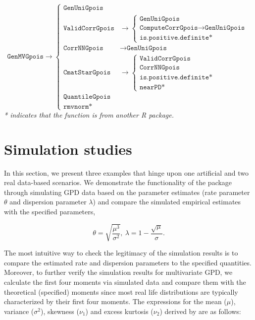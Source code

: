 $$
    \texttt{GenMVGpois} \longrightarrow
    \begin{cases}
        \texttt{GenUniGpois} \\
        \texttt{ValidCorrGpois} & \longrightarrow 
        \begin{cases}
            \texttt{GenUniGpois} \\
            \texttt{ComputeCorrGpois} \longrightarrow \texttt{GenUniGpois} \\
            \texttt{is.positive.definite*}
        \end{cases} \\
        \texttt{CorrNNGpois} & \longrightarrow \texttt{GenUniGpois} \\
        \texttt{CmatStarGpois} & \longrightarrow
        \begin{cases}
            \texttt{ValidCorrGpois} \\
            \texttt{CorrNNGpois} \\
            \texttt{is.positive.definite*} \\ \texttt{nearPD*}
        \end{cases} \\
        \texttt{QuantileGpois} \\
        \texttt{rmvnorm*}
    \end{cases}
$$
\textit{* indicates that the function is from another R package.}

\section{Simulation studies}

In this section, we present three examples that hinge upon one artificial and two real data-based scenarios. We demonstrate the functionality of the package through simulating GPD data based on the parameter estimates (rate parameter $\theta$ and dispersion parameter $\lambda$) and compare the simulated empirical estimates with the specified parameters,

\begin{equation}
\label{eq-1}
    \theta = \sqrt{\frac{\mu^3}{\sigma^2}}, \ \lambda = 1 - \frac{\sqrt{\mu}}{\sigma}.
\end{equation}

The most intuitive way to check the legitimacy of the simulation results is to compare the estimated rate and dispersion parameters to the specified quantities. Moreover, to further verify the simulation results for multivariate GPD, we calculate the first four moments via simulated data and compare them with the theoretical (specified) moments since most real life distributions are typically characterized by their first four moments. The expressions for the mean ($\mu$), variance ($\sigma^2$), skewness ($\nu_1$) and excess kurtosis ($\nu_2$) derived by \cite{consul2006lagrangian} are as follows:

